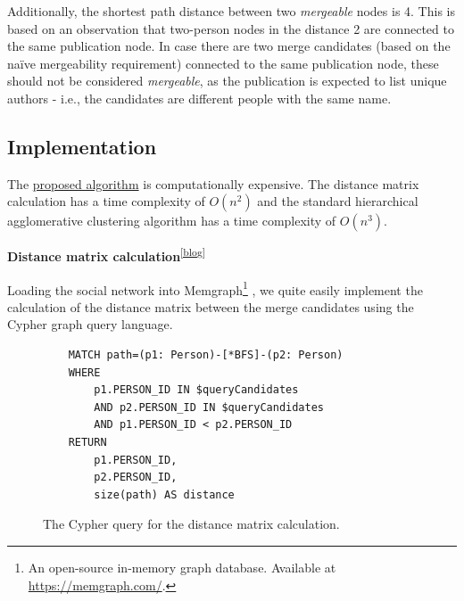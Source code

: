 Additionally, the shortest path distance between two \textit{mergeable} nodes is 4.
This is based on an observation that two-person nodes in the distance 2 are connected to the same publication node.
In case there are two merge candidates (based on the naïve mergeability requirement) connected to the same publication node,
these should not be considered \textit{mergeable}, as the publication is expected to list unique authors - i.e., the candidates are
different people with the same name.

\subsection{Implementation}

The \hyperref[sec:distance-based-hierarchical-clustering]{proposed algorithm} 
is computationally expensive. The distance matrix calculation has a time complexity of $O(n^2)$
and the standard hierarchical agglomerative clustering algorithm has a time complexity of $O(n^3)$.

\textbf{Distance matrix calculation}\textsuperscript{\href{https://barjin.github.io/edu/thesis-blog/inference-distance-matrix/\#distance-matrix-calculation}{[blog]}}

Loading the social network into Memgraph\footnote{An open-source in-memory graph database. Available at \url{https://memgraph.com/}.}
, we quite easily implement the calculation of the distance matrix between the merge candidates using the Cypher graph query language.

\begin{figure}[!ht]
\begin{verbatim}
    MATCH path=(p1: Person)-[*BFS]-(p2: Person)
    WHERE 
        p1.PERSON_ID IN $queryCandidates 
        AND p2.PERSON_ID IN $queryCandidates
        AND p1.PERSON_ID < p2.PERSON_ID
    RETURN 
        p1.PERSON_ID, 
        p2.PERSON_ID, 
        size(path) AS distance
\end{verbatim}
\captionsetup{width=.9\linewidth}
\caption{The Cypher query for the distance matrix calculation.\protect\footnotemark}
\label{fig:distance-matrix-calculation}
\end{figure}


